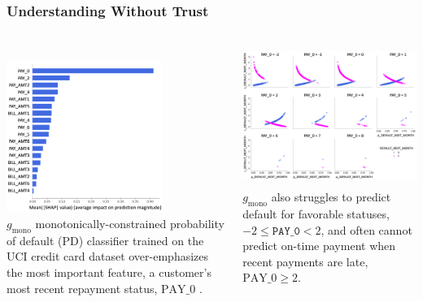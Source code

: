 \documentclass[11pt,aspectratio=169,hyperref={colorlinks}]{beamer}
\begin{document}
	\begin{frame}[label={no_trust}]
	
		\frametitle{Understanding Without Trust}
		
					\begin{columns}
				
						\centering
						\vspace{7pt}\\
						\includegraphics[height=140pt]{../img/global_shap.png}\\
						\vspace{5pt}
						\tiny{$g_{\text{mono}}$ monotonically-constrained probability of default (PD) classifier trained on the UCI credit card dataset over-emphasizes the most important feature, a customer's most recent repayment status, $\text{PAY\_0}$ \cite{uci}.}

						\vspace{10pt}
						\centering
						\includegraphics[height=130pt]{../img/resid.png}\\
						\vspace{5pt}
						\tiny{$g_{\text{mono}}$ also struggles to predict default for favorable statuses, $-2  \leq \texttt{PAY\_0}  < 2$, and often cannot predict on-time payment when recent payments are late, $\text{PAY\_0} \geq 2$}.
				
					\end{columns}
					\normalsize				
		
	\end{frame}
	
\end{document}
